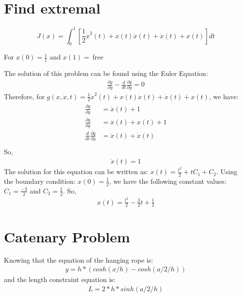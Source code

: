 \documentclass{article}
\begin{document}
\section{Find extremal}

\begin{equation*}
J(x) = \int_{0}^{1} \left[  \frac{1}{2}\dot{x}^2(t) + x(t)\dot{x}(t) + \dot{x}(t) + x(t) \right] dt
\end{equation*}

For $ x(0)=\frac{1}{1}$ and $x(1) = \:$free

The solution of this problem can be found using the Euler Equation:
\begin{eqnarray}
\frac{\partial g}{\partial y} - \frac{d}{dt}\frac{\partial q}{\partial \dot{y}} = 0
\end{eqnarray}
Therefore, for $g(x,\dot{x}, t) = \frac{1}{2}\dot{x}^2(t) + x(t)\dot{x}(t) + \dot{x}(t) + x(t)$, we have:
\begin{eqnarray*}
\begin{split}
\frac{\partial g}{\partial y} &= \dot{x}(t)+1 \\
\frac{\partial q}{\partial \dot{y}} &= \dot{x}(t)+ x(t)+1  \\
\frac{d}{dt}\frac{\partial q}{\partial \dot{y}} &= \ddot{x}(t) + \dot{x}(t) \\
\end{split}
\end{eqnarray*}
So, 
\begin{eqnarray*}
\ddot{x}(t) = 1
\end{eqnarray*}
The solution for this equation can be written as: $ x(t) = \frac{t^2}{2} + tC_1 + C_2$. Using the boundary condition:  $x(0)=\frac{1}{2}$, we have the following constant values: $C_1 = \frac{-3}{2}$ and $C_2 = \frac{1}{2}$.
So,
\begin{eqnarray}
x(t) = \frac{t^2}{2}-\frac{3}{2}t+\frac{1}{2}
\end{eqnarray}

\section{Catenary Problem}

Knowing that the equation of the hanging rope is: 
\begin{eqnarray}
y = h * (cosh(x / h) - cosh(a / 2 / h)) 
\end{eqnarray}
and the length constraint equation is: 
\begin{eqnarray}
L = 2 * h * sinh(a / 2/ h)
\end{eqnarray}
\end{document}
